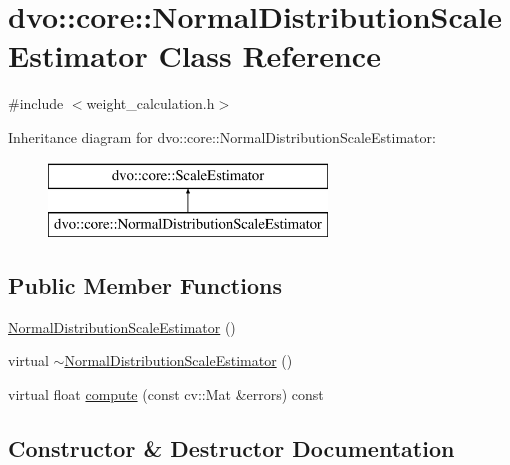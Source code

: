 \hypertarget{classdvo_1_1core_1_1_normal_distribution_scale_estimator}{}\section{dvo\+:\+:core\+:\+:Normal\+Distribution\+Scale\+Estimator Class Reference}
\label{classdvo_1_1core_1_1_normal_distribution_scale_estimator}


{\ttfamily \#include $<$weight\+\_\+calculation.\+h$>$}

Inheritance diagram for dvo\+:\+:core\+:\+:Normal\+Distribution\+Scale\+Estimator\+:\begin{figure}[H]
\begin{center}
\leavevmode
\includegraphics[height=2.000000cm]{classdvo_1_1core_1_1_normal_distribution_scale_estimator}
\end{center}
\end{figure}
\subsection*{Public Member Functions}
\begin{DoxyCompactItemize}
\item 
\mbox{\hyperlink{classdvo_1_1core_1_1_normal_distribution_scale_estimator_a22c312392df41e92c192e4c8372e07d0}{Normal\+Distribution\+Scale\+Estimator}} ()
\item 
virtual \mbox{\hyperlink{classdvo_1_1core_1_1_normal_distribution_scale_estimator_aaa1775b69e07b45786f317f71ae8fad2}{$\sim$\+Normal\+Distribution\+Scale\+Estimator}} ()
\item 
virtual float \mbox{\hyperlink{classdvo_1_1core_1_1_normal_distribution_scale_estimator_a0aa8db7144ffcd1d06704dbf89997446}{compute}} (const cv\+::\+Mat \&errors) const
\end{DoxyCompactItemize}


\subsection{Constructor \& Destructor Documentation}
\mbox{\label{classdvo_1_1core_1_1_normal_distribution_scale_estimator_a22c312392df41e92c192e4c8372e07d0}} 
